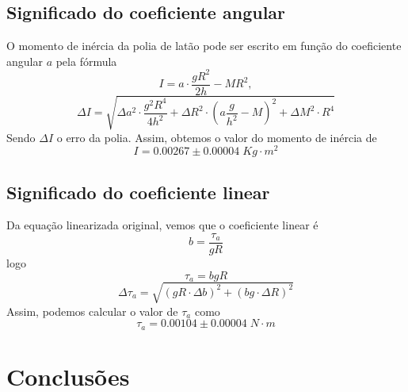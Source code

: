 \documentclass[12pt,a4paper]{article}
\begin{document}
\subsection{Significado do coeficiente angular}
O momento de inércia da polia de latão pode ser escrito em função do coeficiente angular $a$ pela fórmula 
$$I = a\cdot\frac{gR^2}{2h}-MR^2,$$
$$\Delta I = \sqrt{\Delta a^2 \cdot \frac{g^2R^4}{4h^2} + \Delta R^2 \cdot (a\frac{g}{h^2} - M)^2 + \Delta M^2\cdot R^4}$$
Sendo $\Delta I$ o erro da polia.
Assim, obtemos o valor do momento de inércia de 
$$ I = 0.00267 \pm 0.00004 \; Kg \cdot m^2 $$ 

\subsection{Significado do coeficiente linear}
Da equação linearizada original, vemos que o coeficiente linear é 
$$ b = \frac{\tau_a}{gR} $$
logo 
$$ \tau_a = bgR $$
$$ \Delta \tau_a = \sqrt{(gR \cdot \Delta b)^2 + (bg \cdot \Delta R)^2} $$
Assim, podemos calcular o valor de $\tau_a$ como 
$$ \tau_a =  0.00104 \pm 0.00004 \; N \cdot m $$

\section{Conclusões}
\end{document}
